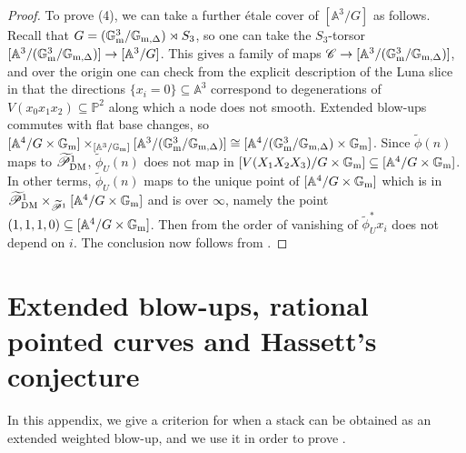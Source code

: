 \documentclass{amsart}
\newcommand{\bA}{\mathbb{A}}
\newcommand{\bG}{\mathbb{G}}
\newcommand{\bP}{\mathbb{P}}
\newcommand{\sC}{\mathscr{C}}
\newcommand{\sP}{\mathscr{P}}
\newcommand{\Gm}{\bG_{{\rm m}}}
\newcommand{\Gmdelta}{\bG_{{\rm m,\Delta}}}
\newcommand{\dm}{{\rm DM}}
\theoremstyle{definition}
\theoremstyle{definition}
\begin{document}
{\begin{proof}
    To prove (4), we can take a further \'etale cover of $[\bA^3/G]$ as follows. Recall that $G=(\Gm^3/\Gmdelta)\rtimes S_3$, so one can take the $S_3$-torsor $[\bA^3/(\Gm^3/\Gmdelta)]\to [\bA^3/G]$. This gives a family of maps $\sC\to [\bA^3/(\Gm^3/\Gmdelta)]$, and over the origin one can check from the explicit description of the Luna slice in  that the directions $\{x_i=0\}\subseteq \bA^3$ correspond to degenerations of $V(x_0x_1x_2)\subseteq \bP^2$ along which a node does not smooth. Extended blow-ups commutes with flat base changes, so $[\bA^4/G\times \Gm]\times_{[\bA^3/\Gm]}[\bA^3/(\Gm^3/\Gmdelta)]\cong[\bA^4/(\Gm^3/\Gmdelta)\times \Gm]$. 
    Since $\widetilde{\phi}(n)$ maps to $\widetilde{\sP}^1_\dm$, $\widetilde{\phi}_U(n)$ does not map in $[V(X_1X_2X_3)/G\times \Gm]\subseteq [\bA^4/G\times \Gm]$. In other terms, $\widetilde{\phi}_U(n)$ maps to the unique point of $[\bA^4/G\times \Gm]$ which is in $\widetilde{\sP}^1_\dm\times_{\widetilde{\sP}^1}[\bA^4/G\times \Gm]$ and is over $\infty$, namely the point $(1,1,1,0)\subseteq [\bA^4/G\times \Gm]$. Then from  the order of vanishing of $\widetilde{\phi}^*_Ux_i$ does not depend on $i$. The conclusion now follows from .
    \end{proof}
\appendix
\section{Extended blow-ups, rational pointed curves and Hassett's conjecture}\label{appendix}
In this appendix, we give a criterion for when a stack can be obtained as an extended weighted blow-up, and we use it in order to prove .
}
\end{document}
